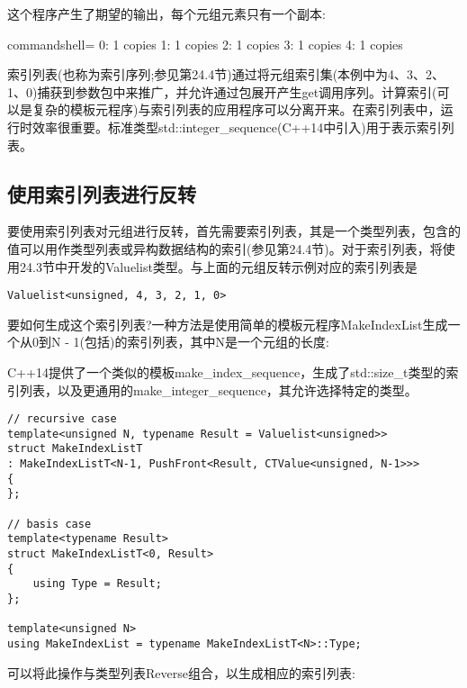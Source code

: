 这个程序产生了期望的输出，每个元组元素只有一个副本:

\begin{tcblisting}{commandshell={}}
0: 1 copies
1: 1 copies
2: 1 copies
3: 1 copies
4: 1 copies
\end{tcblisting}

索引列表(也称为索引序列;参见第24.4节)通过将元组索引集(本例中为4、3、2、1、0)捕获到参数包中来推广，并允许通过包展开产生get调用序列。计算索引(可以是复杂的模板元程序)与索引列表的应用程序可以分离开来。在索引列表中，运行时效率很重要。标准类型std::integer\_sequence(C++14中引入)用于表示索引列表。

\subsection{使用索引列表进行反转}

要使用索引列表对元组进行反转，首先需要索引列表，其是一个类型列表，包含的值可以用作类型列表或异构数据结构的索引(参见第24.4节)。对于索引列表，将使用24.3节中开发的Valuelist类型。与上面的元组反转示例对应的索引列表是

\begin{lstlisting}[style=styleCXX]
Valuelist<unsigned, 4, 3, 2, 1, 0>
\end{lstlisting}

要如何生成这个索引列表?一种方法是使用简单的模板元程序MakeIndexList生成一个从0到N - 1(包括)的索引列表，其中N是一个元组的长度:

\begin{tcolorbox}[colback=webgreen!5!white,colframe=webgreen!75!black]
\hspace*{0.75cm}C++14提供了一个类似的模板make\_index\_sequence，生成了std::size\_t类型的索引列表，以及更通用的make\_integer\_sequence，其允许选择特定的类型。
\end{tcolorbox}

\begin{lstlisting}[style=styleCXX]
// recursive case
template<unsigned N, typename Result = Valuelist<unsigned>>
struct MakeIndexListT
: MakeIndexListT<N-1, PushFront<Result, CTValue<unsigned, N-1>>>
{
};

// basis case
template<typename Result>
struct MakeIndexListT<0, Result>
{
	using Type = Result;
};

template<unsigned N>
using MakeIndexList = typename MakeIndexListT<N>::Type;
\end{lstlisting}

可以将此操作与类型列表Reverse组合，以生成相应的索引列表:

